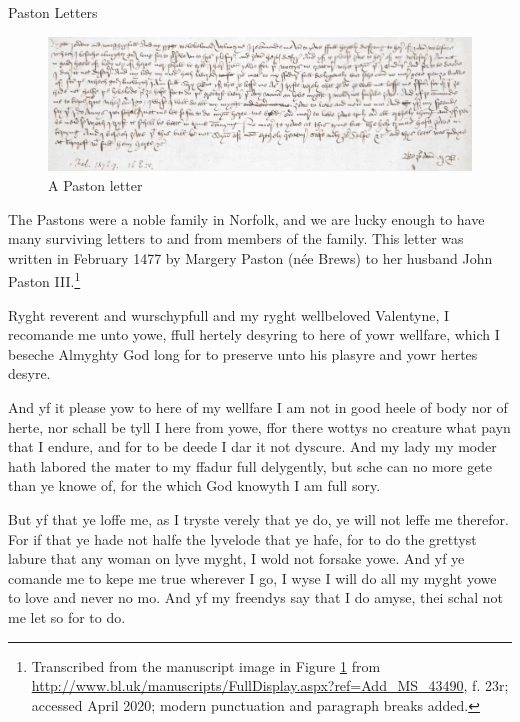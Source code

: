 \largerpage
\begin{texts}{Paston Letters}
\begin{figure}[H]
    \includegraphics[width=\textwidth]{chapters/img/paston-letter.png}
    \caption{A Paston letter}
    \label{fig:paston}
\end{figure}
The Pastons were a noble family in Norfolk, and we are lucky enough to have many surviving letters to and from members of the family. This letter was written in February 1477 by Margery Paston (née Brews) to her husband John Paston III.\footnote{Transcribed from the manuscript image in Figure \ref{fig:paston} from \url{http://www.bl.uk/manuscripts/FullDisplay.aspx?ref=Add_MS_43490}, f. 23r; accessed April 2020; modern punctuation and paragraph breaks added.}


\begin{textglossed}
    \internallinenumbers*{}
  Ryght reverent and wurschypfull and my ryght wellbeloved Valentyne, I recomande me unto yowe, ffull hertely desyring to here of yowr wellfare, which I beseche Almyghty God long for to preserve unto his plasyre and yowr hertes desyre.

  And yf it please yow to here of my wellfare I am not in good heele of body nor of herte, nor schall be tyll I here from yowe, ffor there wottys no creature what payn that I endure, and for to be deede I dar it not dyscure. And my lady my moder hath labored the mater to my ffadur full delygently, but sche can no more gete than ye knowe of, for the which God knowyth I am full sory.

  But yf that ye loffe me, as I tryste verely that ye do, ye will not leffe me therefor. For if that ye hade not halfe the lyvelode that ye hafe, for to do the grettyst labure that any woman on lyve myght, I wold not forsake yowe. And yf ye comande me to kepe me true wherever I go, I wyse I will do all my myght yowe to love and never no mo. And yf my freendys say that I do amyse, thei schal not me let so for to do.


\end{textglossed}
\end{texts}
